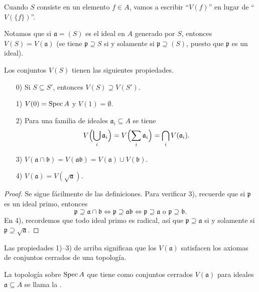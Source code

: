 \documentclass{article}
\numberwithin{equation}{section}
\theoremstyle{definition}
\begin{document}
Cuando $S$ consiste en un elemento $f \in A$, vamos a escribir ``$V (f)$''
en lugar de ``$V (\{ f \})$''.

Notamos que si $\mathfrak{a} = (S)$ es el ideal en $A$ generado por $S$,
entonces $V (S) = V (\mathfrak{a})$ (se tiene $\mathfrak{p} \supseteq S$
si y solamente si $\mathfrak{p} \supseteq (S)$, puesto que $\mathfrak{p}$ es
un ideal).

\begin{observacion}
  Los conjuntos $V (S)$ tienen las siguientes propiedades.

  \begin{enumerate}
  \item[0)] Si $S \subseteq S'$, entonces $V (S) \supseteq V (S')$.

  \item[1)] $V (0) = \operatorname{Spec} A$ y $V (1) = \emptyset$.

  \item[2)] Para una familia de ideales $\mathfrak{a}_i \subseteq A$ se tiene
    $$V \Bigl(\bigcup_i \mathfrak{a}_i\Bigr) = V \Bigl(\sum_i \mathfrak{a}_i\Bigr) = \bigcap_i V (\mathfrak{a}_i).$$

  \item[3)] $V (\mathfrak{a} \cap \mathfrak{b}) = V (\mathfrak{ab}) = V (\mathfrak{a}) \cup V (\mathfrak{b})$.

  \item[4)] $V (\mathfrak{a}) = V (\sqrt{\mathfrak{a}})$.
  \end{enumerate}

  \begin{proof}
    Se sigue fácilmente de las definiciones. Para verificar 3), recuerde que si
    $\mathfrak{p}$ es un ideal primo, entonces
    \[ \mathfrak{p}\supseteq\mathfrak{a} \cap \mathfrak{b} \iff
       \mathfrak{p}\supseteq\mathfrak{ab} \iff
       \mathfrak{p}\supseteq\mathfrak{a}
       \text{ o }\mathfrak{p}\supseteq\mathfrak{b}. \]
    En 4), recordemos que todo ideal primo es radical, así que
    $\mathfrak{p} \supseteq \mathfrak{a}$ si y solamente si
    $\mathfrak{p} \supseteq \sqrt{\mathfrak{a}}$.
  \end{proof}
\end{observacion}

Las propiedades 1)--3) de arriba significan que los $V (\mathfrak{a})$
satisfacen los axiomas de conjuntos cerrados de una topología.

\begin{definicion}
  La topología sobre $\operatorname{Spec} A$ que tiene como conjuntos cerrados
  $V (\mathfrak{a})$ para ideales $\mathfrak{a} \subseteq A$ se llama
  la .
\end{definicion}
\end{document}

